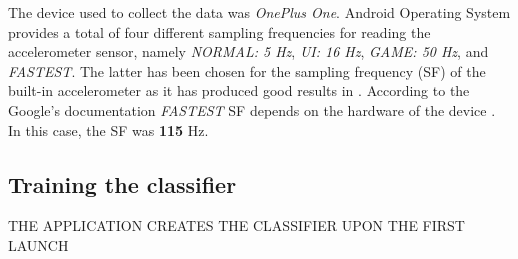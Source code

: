     The device used to collect the data was \textit{OnePlus One}. Android Operating System provides a total of four different sampling frequencies for reading the accelerometer sensor, namely \textit{NORMAL: 5 Hz}, \textit{UI: 16 Hz}, \textit{GAME: 50 Hz}, and \textit{FASTEST}. The latter has been chosen for the sampling frequency (SF) of the built-in accelerometer as it has produced good results in \citet[3-5]{lee2016}. According to the Google's documentation \textit{FASTEST} SF depends on the hardware of the device \citep{googlesensormanager2017}. In this case, the SF was \textbf{115} Hz. 
    
    \subsection{Training the classifier}
    THE APPLICATION CREATES THE CLASSIFIER UPON THE FIRST LAUNCH
    
    
    